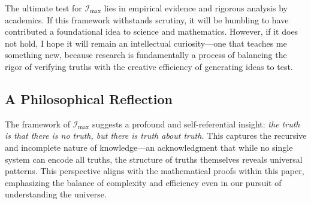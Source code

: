 \documentclass[12pt]{article}
\begin{document}
The ultimate test for \(\mathcal{I}_{\text{max}}\) lies in empirical evidence and rigorous analysis by academics. If this framework withstands scrutiny, it will be humbling to have contributed a foundational idea to science and mathematics. However, if it does not hold, I hope it will remain an intellectual curiosity—one that teaches me something new, because research is fundamentally a process of balancing the rigor of verifying truths with the creative efficiency of generating ideas to test.

\subsection*{A Philosophical Reflection}

The framework of \(\mathcal{I}_{\text{max}}\) suggests a profound and self-referential insight: \textit{the truth is that there is no truth, but there is truth about truth.} This captures the recursive and incomplete nature of knowledge—an acknowledgment that while no single system can encode all truths, the structure of truths themselves reveals universal patterns. This perspective aligns with the mathematical proofs within this paper, emphasizing the balance of complexity and efficiency even in our pursuit of understanding the universe.
\end{document}
